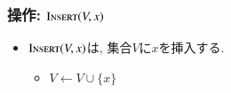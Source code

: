 \documentclass[main]{subfiles}
\begin{document}
\begin{frame}\frametitle{操作: $\mathrm{\text{I\textsc{nsert}}}(V,x)$}
\begin{itemize}
	\item $\mathrm{\text{I\textsc{nsert}}}(V,x)$は, 集合$V$に$x$を挿入する.\\
	\begin{itemize} \item $V \gets V \cup \{x\}$ \end{itemize}
\end{itemize}

\begin{columns}[c]
	\begin{column}{0.5\linewidth}
		
	\end{column}
	\begin{column}{0.49\linewidth}
		
	\end{column}
\end{columns}
\end{frame}
\end{document}
